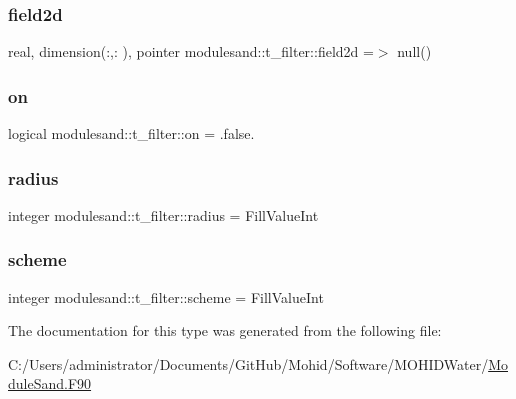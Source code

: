 \subsubsection{\texorpdfstring{field2d}{field2d}}
{\footnotesize\ttfamily real, dimension(\+:,\+:  ), pointer modulesand\+::t\+\_\+filter\+::field2d =$>$ null()\hspace{0.3cm}{\ttfamily [private]}}

\mbox{\label{structmodulesand_1_1t__filter_abf7bc03bf559fd253d8533b23bb149f8}} 
\subsubsection{\texorpdfstring{on}{on}}
{\footnotesize\ttfamily logical modulesand\+::t\+\_\+filter\+::on = .false.\hspace{0.3cm}{\ttfamily [private]}}

\mbox{\label{structmodulesand_1_1t__filter_a690feea9de7fdb267dbadceea4f6b8ca}} 
\subsubsection{\texorpdfstring{radius}{radius}}
{\footnotesize\ttfamily integer modulesand\+::t\+\_\+filter\+::radius = Fill\+Value\+Int\hspace{0.3cm}{\ttfamily [private]}}

\mbox{\label{structmodulesand_1_1t__filter_a0d7cd90462216463e023dcb30d184f76}} 
\subsubsection{\texorpdfstring{scheme}{scheme}}
{\footnotesize\ttfamily integer modulesand\+::t\+\_\+filter\+::scheme = Fill\+Value\+Int\hspace{0.3cm}{\ttfamily [private]}}



The documentation for this type was generated from the following file\+:\begin{DoxyCompactItemize}
\item 
C\+:/\+Users/administrator/\+Documents/\+Git\+Hub/\+Mohid/\+Software/\+M\+O\+H\+I\+D\+Water/\mbox{\hyperlink{_module_sand_8_f90}{Module\+Sand.\+F90}}\end{DoxyCompactItemize}

